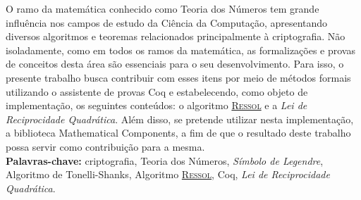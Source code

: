 \setlength{\absparsep}{18pt}
\begin{resumo}

        \noindent
        O ramo da matemática conhecido como Teoria dos Números tem grande influência nos campos de estudo da Ciência da Computação, apresentando diversos algoritmos e teoremas relacionados principalmente à criptografia. Não isoladamente, como em todos os ramos da matemática, as formalizações e provas de conceitos desta área são essenciais para o seu desenvolvimento. Para isso, o presente trabalho busca contribuir com esses itens por meio de métodos formais utilizando o assistente de provas Coq e estabelecendo, como objeto de implementação, os seguintes conteúdos: o algoritmo \hyperref[algo:ressol]{\textsc{Ressol}} e a \textit{Lei de Reciprocidade Quadrática}. Além disso, se pretende utilizar nesta implementação, a biblioteca Mathematical Components, a fim de que o resultado deste trabalho possa servir como contribuição para a mesma.\\
        
        \textbf{Palavras-chave:} criptografia, Teoria dos Números, \textit{Símbolo de Legendre}, Algoritmo de Tonelli-Shanks, Algoritmo \hyperref[algo:ressol]{\textsc{Ressol}}, Coq, \textit{Lei de Reciprocidade Quadrática}.
\end{resumo}